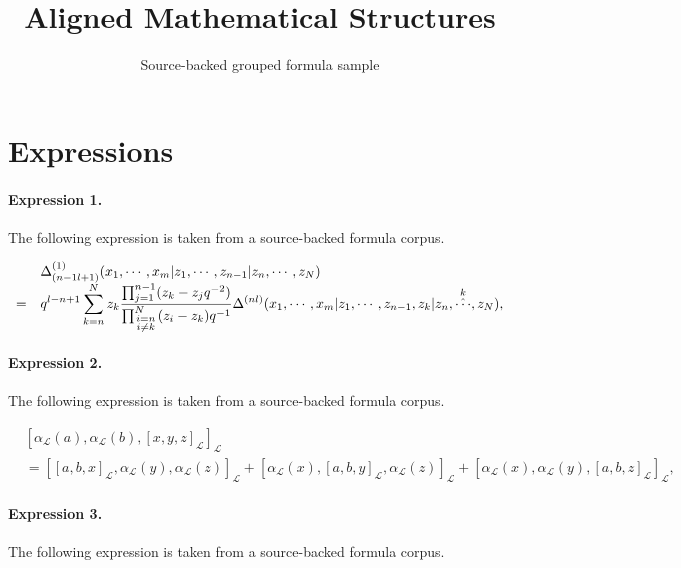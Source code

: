\documentclass[11pt]{article}
\title{Aligned Mathematical Structures}
\author{Source-backed grouped formula sample}
\date{}
\begin{document}
\maketitle
\section{Expressions}
\paragraph{Expression 1.} The following expression is taken from a source-backed formula corpus.

\begin{align*}\begin{array}{cl}&\Delta_{(n-1 l+1)}^{(1)}(x_1,\cdots,x_m|z_1,\cdots,z_{n-1}|z_n,\cdots,z_N) \\=&\displaystyle q^{l-n+1}\sum_{k=n}^{N} z_k\frac{\prod_{j=1}^{n-1}(z_k-z_j q^{-2})}{\prod_{\scriptstyle{i=n}\atop \scriptstyle{i\ne k}}^{N} (z_i-z_k)q^{-1}}\Delta^{(n l)}(x_1,\cdots,x_m|z_1,\cdots, z_{n-1},z_k|z_{n},\mathop{\hat{\cdots}}^{k},z_N), \end{array}\end{align*}

\paragraph{Expression 2.} The following expression is taken from a source-backed formula corpus.

\begin{align*} &[\alpha_{\mathcal{L}}(a),\alpha_{\mathcal{L}}(b),[x,y,z]_{\mathcal{L}}]_{\mathcal{L}}\\ &= [[a,b,x]_{\mathcal{L}}, \alpha_{\mathcal{L}}(y), \alpha_{\mathcal{L}}(z)]_{\mathcal{L}}+ [\alpha_{\mathcal{L}}(x),[a,b,y]_{\mathcal{L}},\alpha_{\mathcal{L}}(z)]_{\mathcal{L}}+[\alpha_{\mathcal{L}}(x),\alpha_{\mathcal{L}}(y),[a,b,z]_{\mathcal{L}}]_{\mathcal{L}},\end{align*}

\paragraph{Expression 3.} The following expression is taken from a source-backed formula corpus.
\end{document}
